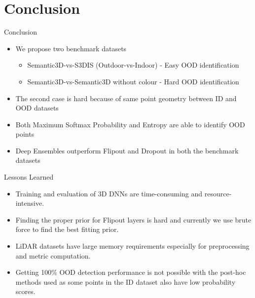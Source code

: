 \documentclass[aspectratio=169]{beamer}
\begin{document}
\section{Conclusion}
\begin{frame}{Conclusion}
    \begin{itemize}
        \item We propose two benchmark datasets 
        \begin{itemize}
            \item Semantic3D-vs-S3DIS (Outdoor-vs-Indoor) - Easy OOD identification
            \item Semantic3D-vs-Semantic3D without colour - Hard OOD identification
        \end{itemize}
        \item The second case is hard because of same point geometry between ID and OOD datasets
        \item Both Maximum Softmax Probability and Entropy are able to identify OOD points
        \item Deep Ensembles outperform Flipout and Dropout in both the benchmark datasets
    \end{itemize}
\end{frame}
\begin{frame}{Lessons Learned}
    \begin{itemize}
        \item Training and evaluation of 3D DNNs are time-consuming and resource-intensive.
        \item Finding the proper prior for Flipout layers is hard and currently we use brute force to find the best fitting prior.
        \item LiDAR datasets have large memory requirements especially for preprocessing and metric computation.
        \item Getting 100\% OOD detection performance is not possible with the post-hoc methods used as some points in the ID dataset also have low probability scores.
    \end{itemize}
\end{frame}
\end{document}
